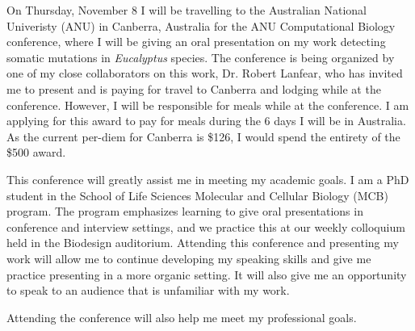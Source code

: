 \documentclass[12pt]{article}
\begin{document}
On Thursday, November 8 I will be travelling to the Australian National Univeristy (ANU) in Canberra, Australia for the ANU Computational Biology conference, where I will be giving an oral presentation on my work detecting somatic mutations in \textit{Eucalyptus} species. 
The conference is being organized by one of my close collaborators on this work, Dr. Robert Lanfear, who has invited me to present and is paying for travel to Canberra and lodging while at the conference. However, I will be responsible for meals while at the conference. I am applying for this award to pay for meals during the 6 days I will be in Australia. As the current per-diem for Canberra is \$126, I would spend the entirety of the \$500 award.

This conference will greatly assist me in meeting my academic goals. I am a PhD student in the School of Life Sciences Molecular and Cellular Biology (MCB) program. The program emphasizes learning to give oral presentations in conference and interview settings, and we practice this at our weekly colloquium held in the Biodesign auditorium. Attending this conference and presenting my work will allow me to continue developing my speaking skills and give me practice presenting in a more organic setting. It will also give me an opportunity to speak to an audience that is unfamiliar with my work. %

Attending the conference will also help me meet my professional goals.
\end{document}
